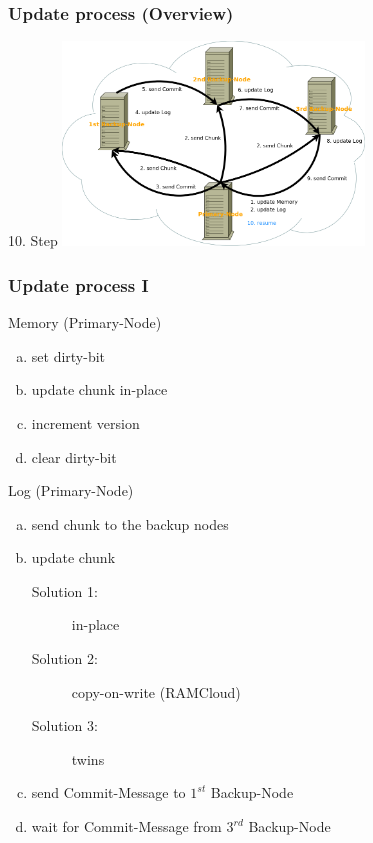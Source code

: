 \documentclass{beamer}
\begin{document}
	\begin{frame}
		\frametitle{Update process (Overview)}

		\begin{block}{10. Step}
			\center\includegraphics[width=8cm]{./img/Log_Overview_10}
		\end{block}
	\end{frame}

	\begin{frame}
		\frametitle{Update process I}

		\begin{block}{Memory (Primary-Node)}
			\begin{enumerate}[(a)]
				\item set dirty-bit
				\item update chunk in-place
				\item increment version
				\item clear dirty-bit
			\end{enumerate}
		\end{block}

		\begin{block}{Log (Primary-Node)}
			\begin{enumerate}[(a)]
				\item send chunk to the backup nodes
				\item update chunk
					\begin{description}
						\item[Solution 1:] in-place
						\item[Solution 2:] copy-on-write (RAMCloud)
						\item[Solution 3:] twins
					\end{description}
				\item send Commit-Message to $1^{st}$ Backup-Node
				\item wait for Commit-Message from $3^{rd}$ Backup-Node
			\end{enumerate}
		\end{block}
	\end{frame}
\end{document}
